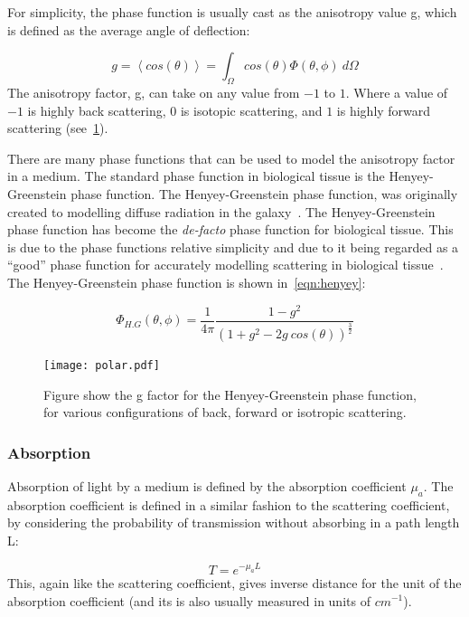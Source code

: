 For simplicity, the phase function is usually cast as the anisotropy value g, which is defined as the average angle of deflection:

\begin{equation}
	g=\left<cos(\theta)\right>=\int_{\Omega}cos(\theta)\Phi(\theta,\phi)\ d\Omega
\end{equation}
The anisotropy factor, g, can take on any value from $-1$ to $1$. Where a value of $-1$ is highly back scattering, $0$ is isotopic scattering, and $1$ is highly forward scattering (see~\cref{fig:henyey}).


There are many phase functions that can be used to model the anisotropy factor in a medium. The standard phase function in biological tissue is the Henyey-Greenstein phase function. The Henyey-Greenstein phase function, was originally created to modelling diffuse radiation in the galaxy~\cite{lister2012optical,henyey1941diffuse}. The Henyey-Greenstein phase function has become the \textit{de-facto} phase function for biological tissue. This is due to the phase functions relative simplicity and due to it being regarded as a ``good'' phase function for accurately modelling scattering in biological tissue~\cite{jacques1987angular}.
The Henyey-Greenstein phase function is shown in~\cref{eqn:henyey}:

\begin{equation}
	\Phi_{H.G}(\theta,\phi)=\frac{1}{4\pi}\frac{1-g^2}{(1+g^2-2g\ cos(\theta))^{\tfrac{3}{2}}}
	\label{eqn:henyey}
\end{equation}

\begin{figure}
	\centering
	\texttt{[image: polar.pdf]}
	\caption{Figure show the g factor for the Henyey-Greenstein phase function, for various configurations of back, forward or isotropic scattering.}
	\label{fig:henyey}
\end{figure}

\subsubsection*{Absorption}\label{sec:absor}

Absorption of light by a medium is defined by the absorption coefficient $\mu_a$. The absorption coefficient is defined in a similar fashion to the scattering coefficient, by considering the probability of transmission without absorbing in a path length L:

\begin{equation}
	T=e^{-\mu_aL}
\end{equation}
This, again like the scattering coefficient, gives inverse distance for the unit of the absorption coefficient (and its is also usually measured in units of $cm^{-1}$).

